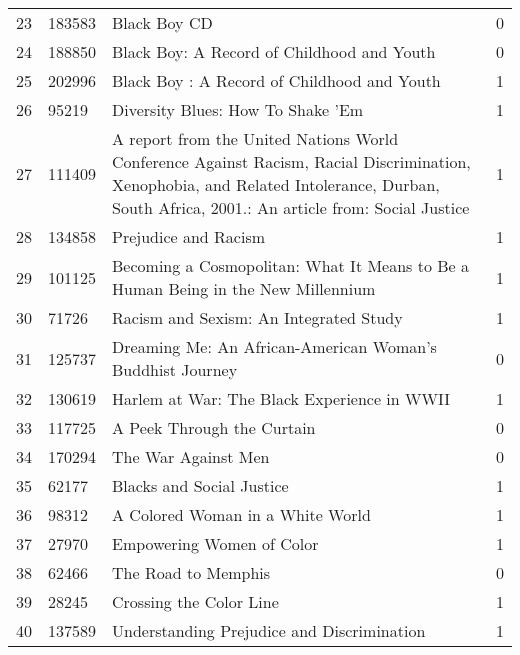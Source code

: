 \begin{tabular}{llll}
23 & 183583 & Black Boy CD & 0 \\
24 & 188850 & Black Boy: A Record of Childhood and Youth & 0 \\
25 & 202996 & Black Boy : A Record of Childhood and Youth & 1 \\
26 & 95219 & Diversity Blues: How To Shake 'Em & 1 \\
27 & 111409 & A report from the United Nations World Conference Against Racism, Racial Discrimination, Xenophobia, and Related Intolerance, Durban, South Africa, 2001.: An article from: Social Justice & 1 \\
28 & 134858 & Prejudice and Racism & 1 \\
29 & 101125 & Becoming a Cosmopolitan: What It Means to Be a Human Being in the New Millennium & 1 \\
30 & 71726 & Racism and Sexism: An Integrated Study & 1 \\
31 & 125737 & Dreaming Me: An African-American Woman's Buddhist Journey & 0 \\
32 & 130619 & Harlem at War: The Black Experience in WWII & 1 \\
33 & 117725 & A Peek Through the Curtain & 0 \\
34 & 170294 & The War Against Men & 0 \\
35 & 62177 & Blacks and Social Justice & 1 \\
36 & 98312 & A Colored Woman in a White World & 1 \\
37 & 27970 & Empowering Women of Color & 1 \\
38 & 62466 & The Road to Memphis & 0 \\
39 & 28245 & Crossing the Color Line & 1 \\
40 & 137589 & Understanding Prejudice and Discrimination & 1 \\
\bottomrule
\end{tabular}
